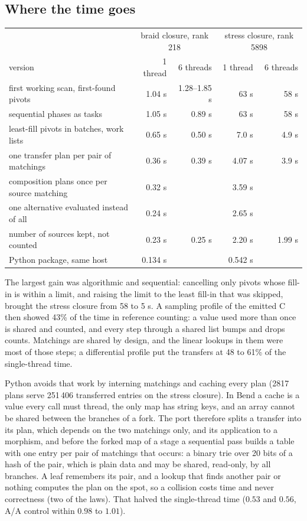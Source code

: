 \subsection{Where the time goes}
\begin{center}
\begin{tabular}{lrrrr}
\toprule
 & \multicolumn{2}{c}{braid closure, rank 218} & \multicolumn{2}{c}{stress closure, rank 5898}\\
version & 1 thread & 6 threads & 1 thread & 6 threads\\
\midrule
first working scan, first-found pivots & 1.04 s & 1.28--1.85 s & 63 s & 58 s\\
sequential phases as tasks & 1.05 s & 0.89 s & 63 s & 58 s\\
least-fill pivots in batches, work lists & 0.65 s & 0.50 s & 7.0 s & 4.9 s\\
one transfer plan per pair of matchings & 0.36 s & 0.39 s & 4.07 s & 3.9 s\\
composition plans once per source matching & 0.32 s & & 3.59 s & \\
one alternative evaluated instead of all & 0.24 s & & 2.65 s & \\
number of sources kept, not counted & 0.23 s & 0.25 s & 2.20 s & 1.99 s\\
Python package, same host & 0.134 s & & 0.542 s & \\
\bottomrule
\end{tabular}
\end{center}
The largest gain was algorithmic and sequential: cancelling only pivots whose
fill-in is within a limit, and raising the limit to the least fill-in that was
skipped, brought the stress closure from 58 to 5 s. A sampling profile of the
emitted C then showed 43\% of the time in reference counting: a value used more
than once is shared and counted, and every step through a shared list bumps and
drops counts. Matchings are shared by design, and the linear lookups in them
were most of those steps; a differential profile put the transfers at 48 to
61\% of the single-thread time.

Python avoids that work by interning matchings and caching every plan (2817
plans serve 251\,406 transferred entries on the stress closure). In Bend a cache
is a value every call must thread, the only map has string keys, and an array
cannot be shared between the branches of a fork. The port therefore splits a
transfer into its plan, which depends on the two matchings only, and its
application to a morphism, and before the forked map of a stage a sequential
pass builds a table with one entry per pair of matchings that occurs: a binary
trie over 20 bits of a hash of the pair, which is plain data and may be shared,
read-only, by all branches. A leaf remembers its pair, and a lookup that finds
another pair or nothing computes the plan on the spot, so a collision costs time
and never correctness (two of the laws). That halved the single-thread time
($0.53$ and $0.56$, A/A control within $0.98$ to $1.01$).

